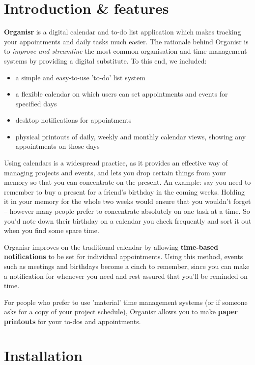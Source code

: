 \section{Introduction \& features}


\textbf{Organisr} is a digital calendar and to-do list application which makes
tracking your appointments and daily tasks much easier. The rationale behind
Organisr is to \textit{improve and streamline} the most common organisation and
time management systems by providing a digital substitute. To this end, we
included:

\begin{itemize}
    \item a simple and easy-to-use 'to-do' list system
    \item a flexible calendar on which users can set appointments and events for
        specified days
    \item desktop notifications for appointments
    \item physical printouts of daily, weekly and monthly calendar views,
        showing any appointments on those days
\end{itemize}

Using calendars is a widespread practice, as it provides an effective way of
managing projects and events, and lets you drop certain things from your memory
so that you can concentrate on the present. An example: say you need to remember
to buy a present for a friend's birthday in the coming weeks. Holding it in
your memory for the whole two weeks would ensure that you wouldn't forget --
however many people prefer to concentrate absolutely on one task at a time.
So you'd note down their birthday on a calendar you check frequently and sort
it out when you find some spare time.

Organisr improves on the traditional calendar by allowing \textbf{time-based
notifications} to be set for individual appointments. Using this method, events
such as meetings and birthdays become a cinch to remember, since you can make a
notification for whenever you need and rest assured that you'll be reminded on
time.

For people who prefer to use 'material' time management systems (or if someone
asks for a copy of your project schedule), Organisr allows you to make
\textbf{paper printouts} for your to-dos and appointments.


\section{Installation}

